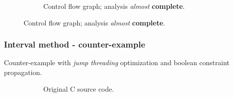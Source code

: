 \documentclass[aspectratio=1610]{beamer}
\begin{document}
\begin{frame}[noframenumbering]
\begin{figure}[htbp]
\begin{subfigure}[b]{0.50\textwidth}
			\caption{Control flow graph; analysis \textit{almost} \textbf{complete}.}
		\end{subfigure}
	\end{figure}
\end{frame}



\begin{frame}
	\frametitle{Interval method - counter-example}
	Counter-example with \textit{jump threading} optimization and boolean constraint propagation.
	\begin{figure}[htbp]
		\centering
		\begin{subfigure}[b]{0.30\textwidth}
			\centering
			
			\caption{Original C source code.}
		\end{subfigure}
		\begin{subfigure}[b]{0.50\textwidth}
			\centering

\end{subfigure}
\end{figure}
\end{frame}
\end{document}
